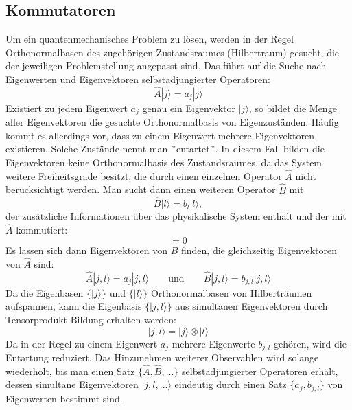 \documentclass[9pt]{report}
\begin{document}
\subsection{Kommutatoren}
Um ein quantenmechanisches Problem zu lösen, werden in der Regel Orthonormalbasen des zugehörigen Zustandsraumes (Hilbertraum) gesucht, die der jeweiligen Problemstellung angepasst sind. Das führt auf die Suche nach Eigenwerten und Eigenvektoren selbstadjungierter Operatoren:
\begin{equation}
\hat{A}|j\rangle = a_{j}|j\rangle
\end{equation}
Existiert zu jedem Eigenwert $a_{j}$ genau ein Eigenvektor $|j\rangle$, so bildet die Menge aller Eigenvektoren die gesuchte Orthonormalbasis von Eigenzuständen. Häufig kommt es allerdings vor, dass zu einem Eigenwert mehrere Eigenvektoren existieren. Solche Zustände nennt man $"$entartet$"$. In diesem Fall bilden die Eigenvektoren keine Orthonormalbasis des Zustandsraumes, da das System weitere Freiheitsgrade besitzt, die durch einen einzelnen Operator $\hat{A}$ nicht berücksichtigt werden. Man sucht dann einen weiteren Operator $\hat{B}$ mit
\begin{equation}
\hat{B}|l\rangle = b_{l}|l\rangle,
\end{equation}
der zusätzliche Informationen über das physikalische System enthält und der mit $\hat{A}$ kommutiert:
\begin{equation}
[\hat{A},\hat{B}]=0
\end{equation}
Es lassen sich dann Eigenvektoren von $\hat{B}$ finden, die gleichzeitig Eigenvektoren von $\hat{A}$ sind:
\begin{equation}
\hat{A}|j,l\rangle = a_{j}|j,l\rangle\qquad\mathrm{und}\qquad\hat{B}|j,l\rangle = b_{j,l}|j,l\rangle
\end{equation}
Da die Eigenbasen $\{|j\rangle\}$ und $\{|l\rangle\}$ Orthonormalbasen von Hilberträumen aufspannen, kann die Eigenbasis $\{|j,l\rangle\}$ aus simultanen Eigenvektoren durch Tensorprodukt-Bildung erhalten werden:
\begin{equation}
|j,l\rangle = |j\rangle\otimes|l\rangle
\end{equation}
Da in der Regel zu einem Eigenwert $a_{j}$ mehrere Eigenwerte $b_{j,l}$ gehören, wird die Entartung reduziert. Das Hinzunehmen weiterer Observablen wird solange wiederholt, bis man einen Satz $\{\hat{A},\hat{B},...\}$ selbstadjungierter Operatoren erhält, dessen simultane Eigenvektoren $|j,l,...\rangle$ eindeutig durch einen Satz $\{a_{j},b_{j,l}\}$ von Eigenwerten bestimmt sind.
\end{document}
